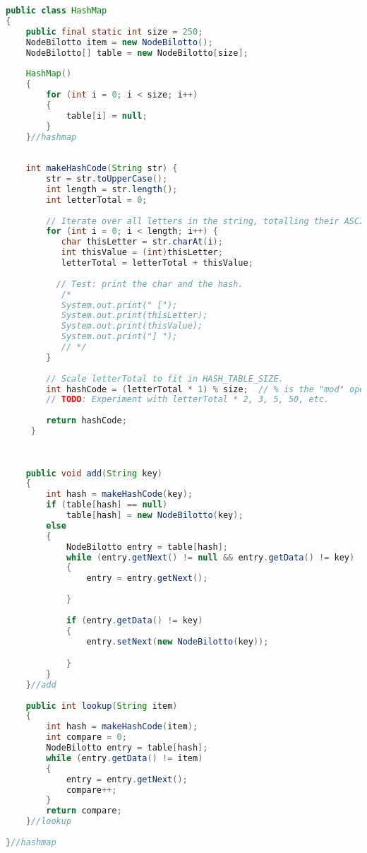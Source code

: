 \documentclass[letterpaper, 10pt]{article}
\begin{document}
\begin{lstlisting}[language = java]
public class HashMap 
{
	public final static int size = 250;
	NodeBilotto item = new NodeBilotto();
	NodeBilotto[] table = new NodeBilotto[size];
	
	HashMap()
	{
		for (int i = 0; i < size; i++)
		{
			table[i] = null;
		}
	}//hashmap
	
	
	int makeHashCode(String str) {
        str = str.toUpperCase();
        int length = str.length();
        int letterTotal = 0;
  
        // Iterate over all letters in the string, totalling their ASCII values.
        for (int i = 0; i < length; i++) {
           char thisLetter = str.charAt(i);
           int thisValue = (int)thisLetter;
           letterTotal = letterTotal + thisValue;
  
          // Test: print the char and the hash.
           /* 
           System.out.print(" ["); 
           System.out.print(thisLetter); 
           System.out.print(thisValue); 
           System.out.print("] "); 
           // */
        }
  
        // Scale letterTotal to fit in HASH_TABLE_SIZE.
        int hashCode = (letterTotal * 1) % size;  // % is the "mod" operator
        // TODO: Experiment with letterTotal * 2, 3, 5, 50, etc.
  
        return hashCode;
     }
	
	
	
	public void add(String key)
	{
		int hash = makeHashCode(key);
		if (table[hash] == null)
			table[hash] = new NodeBilotto(key);
		else
		{
			NodeBilotto entry = table[hash];
			while (entry.getNext() != null && entry.getData() != key)
			{
				entry = entry.getNext();
				
			}
			
			if (entry.getData() != key)
			{
				entry.setNext(new NodeBilotto(key));

			}
		}
	}//add
	
	public int lookup(String item)
	{
		int hash = makeHashCode(item);
		int compare = 0;
		NodeBilotto entry = table[hash];
		while (entry.getData() != item)
		{
			entry = entry.getNext();
			compare++;
		}
		return compare;
	}//lookup
	
}//hashmap

\end{lstlisting}
\end{document}
